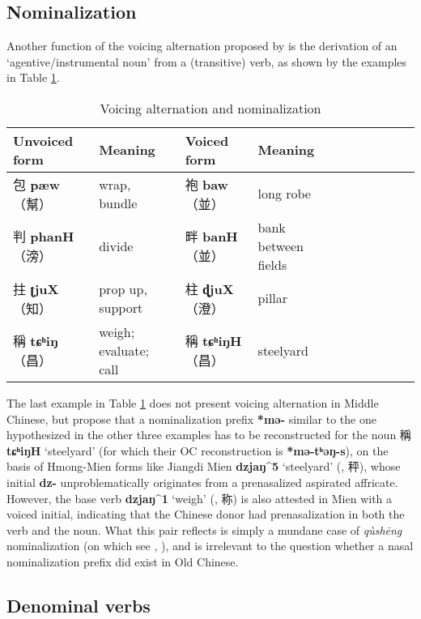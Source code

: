 \documentclass[oneside,a4paper,11pt]{article}
\newcommand{\ipa}[1]{\textbf{{\phon\mbox{#1}}}} %
\newcommand{\zh}[1]{{\cn #1}}
\newcommand{\zhc}[2]{\zh{#1} \ipa{#2}}
\newcommand{\mc}[1]{\zh{（#1）}}
\begin{document}
\citet[282-4]{wangyt14jingdian}
\subsection{Nominalization}
Another function of the voicing alternation proposed by \citet[55]{bs14oc} is the derivation of an `agentive/instrumental noun' from a (transitive) verb, as shown by the examples in Table \ref{tab:nmlz.voicing.oc}.


\begin{table}[H]
\caption{Voicing alternation and nominalization} \label{tab:nmlz.voicing.oc}
\begin{tabular}{llllllllll}
\toprule
Unvoiced form &Meaning & Voiced form & Meaning\\
\midrule
\zhc{包}{pæw} \mc{幫}	&wrap, bundle & \zhc{袍}{baw} \mc{並} & long robe \\
\zhc{判}{phanH} \mc{滂}	&divide & \zhc{畔}{banH} \mc{並} & bank between fields \\
\zhc{拄}{ʈjuX} \mc{知}	&prop up, support  & \zhc{柱}{ɖjuX} \mc{澄} & pillar \\
\zhc{稱}{tɕʰiŋ} \mc{昌}	&weigh; evaluate; call & \zhc{稱}{tɕʰiŋH} \mc{昌} & steelyard \\
\bottomrule
\end{tabular}
\end{table}

The last example in Table \ref{tab:nmlz.voicing.oc} does not present voicing alternation in Middle Chinese, but \citet{bs14oc} propose that a nominalization prefix \ipa{*mə-} similar to the one hypothesized in the other three examples has to be reconstructed for the noun \zhc{稱}{tɕʰiŋH} `steelyard' (for which their OC reconstruction is \ipa{*mə-tʰəŋ-s}), on the basis of Hmong-Mien forms like Jiangdi Mien \ipa{dzjaŋ^5} `steelyard' (\citealt[68]{maozw92mien}, \zh{秤}), whose initial \ipa{dz-} unproblematically originates from a prenasalized aspirated affricate. However, the base verb \ipa{dzjaŋ^1} `weigh' (\citet[167]{maozw92mien}, \zh{称}) is also attested in Mien with a voiced initial, indicating that the Chinese donor had prenasalization in both the verb and the noun. What this pair reflects is simply a mundane case of \textit{qùshēng} nominalization (on which see \citealt{downer59}, \citealt{jacques16ssuffixes}), and is irrelevant to the question whether a nasal nominalization prefix did exist in Old Chinese.


\subsection{Denominal verbs}
\citet[55]{bs14oc}
\end{document}
